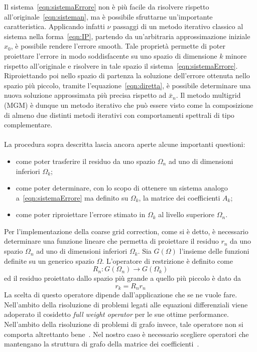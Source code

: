 Il sistema~\eqref{eqn:sistemaErrore} non è più facile da risolvere rispetto all'originale~\eqref{eqn:sisteman}, ma è possibile sfruttarne un'importante caratteristica.
Applicando infatti $\nu$ passaggi di un metodo iterativo classico al sistema nella forma~\eqref{eqn:IP}, partendo da un'arbitraria approssimazione iniziale $x_0$, è possibile rendere l'errore smooth.
Tale proprietà permette di poter proiettare l'errore in modo soddisfacente su uno spazio di dimensione $k$ minore rispetto all'originale e risolvere in tale spazio il sistema~\eqref{eqn:sistemaErrore}.
Riproiettando poi nello spazio di partenza la soluzione dell'errore ottenuta nello spazio più piccolo, tramite l'equazione~\eqref{eqn:diretta}, è possibile determinare una nuova soluzione approssimata più precisa rispetto ad $\bar{x}_n$.
Il metodo multigrid (MGM) è dunque un metodo iterativo che può essere visto come la composizione di almeno due distinti metodi iterativi con comportamenti spettrali di tipo complementare.\\
\\
La procedura sopra descritta lascia ancora aperte alcune importanti questioni:
\begin{itemize}
\item come poter trasferire il residuo da uno spazio $\Omega_n$ ad uno di dimensioni inferiori $\Omega_k$;
\item come poter determinare, con lo scopo di ottenere un sistema analogo a~\eqref{eqn:sistemaErrore} ma definito su $\Omega_k$, la matrice dei coefficienti $A_k$;
\item come poter riproiettare l'errore stimato in $\Omega_k$ al livello superiore $\Omega_n$.
\end{itemize}


Per l'implementazione della coarse grid correction, come si è detto, è necessario determinare una funzione lineare che permetta di proiettare il residuo $r_n$ da uno spazio $\Omega_n$ ad uno di dimensioni inferiori $\Omega_k$.
Sia $G(\Omega)$ l'insieme delle funzioni definite su un generico spazio $\Omega$. L'operatore di restrizione è definito come
\begin{equation*}
R_n : G(\Omega_n) \to G(\Omega_k)
\end{equation*}
ed il residuo proiettato dallo spazio più grande a quello più piccolo è dato da
\begin{equation*}
r_k = R_nr_n
\end{equation*}
La scelta di questo operatore dipende dall'applicazione che se ne vuole fare. 
Nell'ambito della risoluzione di problemi legati alle equazioni differenziali viene adoperato il cosidetto \emph{full weight operator} per le sue ottime performance.
Nell'ambito della risoluzione di problemi di grafo invece, tale operatore non si comporta altrettanto bene~\cite{fiderio}.
Nel nostro caso è necessario scegliere operatori che mantengano la struttura di grafo della matrice dei coefficienti~\cite{MGM_frangio}.

